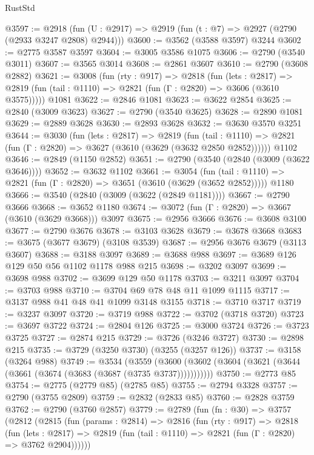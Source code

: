 \begin{lexlean}{RustStd}
\begin{coremodule}
@3597 := @2918 (fun (U : @2917) => @2919 (fun (t : @7) => @2927 (@2790 (@2933 @3247 @2808) @2944)))
@3600 := @3562 (@3588 @3597) @3244
@3602 := @2775 @3587 @3597
@3604 := @3005 @3586 @1075
@3606 := @2790 (@3540 @3011)
@3607 := @3565 @3014
@3608 := @2861 @3607
@3610 := @2790 (@3608 @2882)
@3621 := @3008
    (fun (rty : @917) =>
    @2818
      (fun (lets : @2817) =>
      @2819 (fun (tail : @1110) => @2821 (fun (Γ : @2820) => @3606 (@3610 @3575)))))
    @1081
@3622 := @2846 @1081
@3623 := @3622 @2854
@3625 := @2840 (@3009 @3623)
@3627 := @2790 (@3540 @3625)
@3628 := @2890 @1081
@3629 := @2889 @3628
@3630 := @2893 @3628
@3632 := @3630 @3570 @3251
@3644 := @3030
    (fun (lets : @2817) =>
    @2819
      (fun (tail : @1110) => @2821 (fun (Γ : @2820) => @3627 (@3610 (@3629 (@3632 @2850 @2852))))))
    @1102
@3646 := @2849 (@1150 @2852)
@3651 := @2790 (@3540 (@2840 (@3009 (@3622 @3646))))
@3652 := @3632 @1102
@3661 := @3054
    (fun (tail : @1110) => @2821 (fun (Γ : @2820) => @3651 (@3610 (@3629 (@3652 @2852)))))
    @1180
@3666 := @3540 (@2840 (@3009 (@3622 (@2849 @1181))))
@3667 := @2790 @3666
@3668 := @3652 @1180
@3674 := @3072 (fun (Γ : @2820) => @3667 (@3610 (@3629 @3668))) @3097
@3675 := @2956 @3666
@3676 := @3608 @3100
@3677 := @2790 @3676
@3678 := @3103 @3628
@3679 := @3678 @3668
@3683 := @3675 (@3677 @3679) (@3108 @3539)
@3687 := @2956 @3676 @3679 (@3113 @3607)
@3688 := @3188 @3097
@3689 := @3688 @988
@3697 := @3689 @126 @129 @50 @56 @1102 @1178 @988 @215
@3698 := @3202 @3097
@3699 := @3698 @988
@3702 := @3699 @129 @50 @1178
@3703 := @3211 @3097
@3704 := @3703 @988
@3710 := @3704 @69 @78 @48 @11 @1099 @1115
@3717 := @3137 @988 @41 @48 @41 @1099 @3148 @3155
@3718 := @3710 @3717
@3719 := @3237 @3097
@3720 := @3719 @988
@3722 := @3702 (@3718 @3720)
@3723 := @3697 @3722
@3724 := @2804 @126
@3725 := @3000 @3724
@3726 := @3723 @3725
@3727 := @2874 @215
@3729 := @3726 (@3246 @3727)
@3730 := @2898 @215
@3735 := @3729 (@3250 @3730) (@3255 (@3257 @126))
@3737 := @3158 (@3264 @988)
@3749 := @3534
    (@3559 (@3600 (@3602 (@3604 (@3621 (@3644 (@3661 (@3674 (@3683 (@3687 (@3735 @3737)))))))))))
@3750 := @2773 @85
@3754 := @2775 (@2779 @85) (@2785 @85)
@3755 := @2794 @3328
@3757 := @2790 (@3755 @2809)
@3759 := @2832 (@2833 @85)
@3760 := @2828 @3759
@3762 := @2790 (@3760 @2857)
@3779 := @2789
    (fun (fn : @30) =>
    @3757
      (@2812
        (@2815
          (fun (params : @2814) =>
          @2816
            (fun (rty : @917) =>
            @2818
              (fun (lets : @2817) =>
              @2819 (fun (tail : @1110) => @2821 (fun (Γ : @2820) => @3762 @2904))))))

\end{coremodule}
\end{lexlean}
